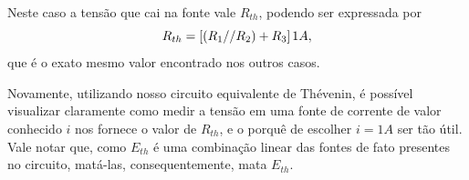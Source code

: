 \documentclass{article}
\numberwithin{equation}{section}
\newlength\Colsep
\begin{document}
\noindent\begin{minipage}{\textwidth}
\begin{minipage}[c][4cm][c]{\dimexpr0.5\textwidth-0.5\Colsep\relax}
    \begin{center}
    \end{center}
\end{minipage}
\begin{minipage}[c][4cm][c]{\dimexpr0.5\textwidth-0.5\Colsep\relax}
    Neste caso a tensão que cai na fonte vale $R_{th}$, podendo ser expressada por
    $$R_{th}=[(R_1//R_2)+R_3]\hspace{0.05cm} 1A,$$
    que é o exato mesmo valor encontrado nos outros casos.
\end{minipage}
\end{minipage}

\noindent\begin{minipage}{\textwidth}
\begin{minipage}[c][4cm][c]{\dimexpr0.5\textwidth-0.5\Colsep\relax}
    \begin{center}
\end{center}
\end{minipage}
\begin{minipage}[c][4cm][c]{\dimexpr0.5\textwidth-0.5\Colsep\relax}
    Novamente, utilizando nosso circuito equivalente de Thévenin, é possível visualizar claramente como medir a tensão em uma fonte de corrente de valor conhecido $i$ nos fornece o valor de $R_{th}$, e o porquê de escolher $i = 1A$ ser tão útil. Vale notar que, como $E_{th}$ é uma combinação linear das fontes de fato presentes no circuito, matá-las, consequentemente, mata $E_{th}$.
\end{minipage}
\end{minipage}
\end{document}

